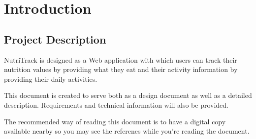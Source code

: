 \section{Introduction}
\subsection{Project Description}
\par NutriTrack is designed as a Web application with which users
can track their nutrition values by providing what they eat and
their activity information by providing their daily activities.

\par This document is created to serve both as a design document as well as 
a detailed description. Requirements and technical information will also be provided.

The recommended way of reading this document is to have a digital copy 
available nearby so you may see the referenes while you're reading the document.